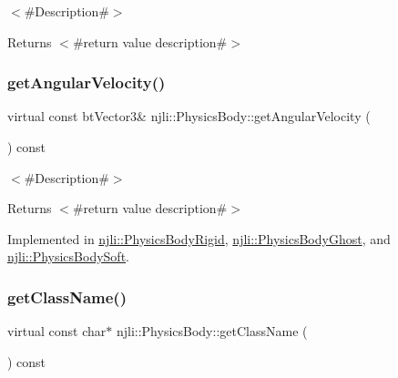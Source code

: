 $<$\#\+Description\#$>$

\begin{DoxyReturn}{Returns}
$<$\#return value description\#$>$ 
\end{DoxyReturn}
\mbox{\label{classnjli_1_1_physics_body_a598de298accae3b59c821ab8e640d464}} 
\subsubsection{\texorpdfstring{get\+Angular\+Velocity()}{getAngularVelocity()}}
{\footnotesize\ttfamily virtual const bt\+Vector3\& njli\+::\+Physics\+Body\+::get\+Angular\+Velocity (\begin{DoxyParamCaption}{ }\end{DoxyParamCaption}) const\hspace{0.3cm}{\ttfamily [pure virtual]}}

$<$\#\+Description\#$>$

\begin{DoxyReturn}{Returns}
$<$\#return value description\#$>$ 
\end{DoxyReturn}


Implemented in \mbox{\hyperlink{classnjli_1_1_physics_body_rigid_a13bb91357c547d832411c02be5e89260}{njli\+::\+Physics\+Body\+Rigid}}, \mbox{\hyperlink{classnjli_1_1_physics_body_ghost_a01a4600e0521f09ec19879c1bdea3b8c}{njli\+::\+Physics\+Body\+Ghost}}, and \mbox{\hyperlink{classnjli_1_1_physics_body_soft_abda1dce34eaaf0e2524d2f6afde1c502}{njli\+::\+Physics\+Body\+Soft}}.

\mbox{\label{classnjli_1_1_physics_body_a9ba235d39a1b994f22a13edeff862ba3}} 
\subsubsection{\texorpdfstring{get\+Class\+Name()}{getClassName()}}
{\footnotesize\ttfamily virtual const char$\ast$ njli\+::\+Physics\+Body\+::get\+Class\+Name (\begin{DoxyParamCaption}{ }\end{DoxyParamCaption}) const\hspace{0.3cm}{\ttfamily [pure virtual]}}

